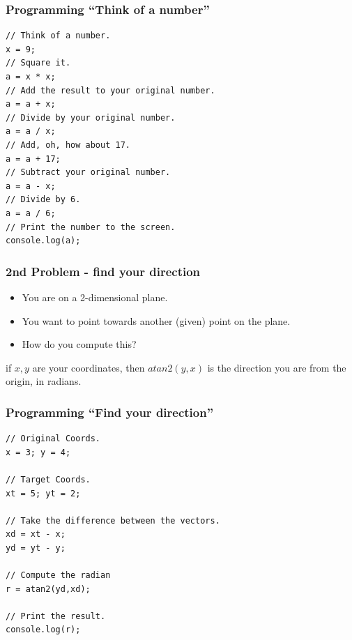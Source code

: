 \documentclass{beamer}
\begin{document}
\begin{frame}[fragile]
\frametitle{Programming ``Think of a number''}

\begin{codeblock}
\begin{verbatim}
// Think of a number.                                                                                                     
x = 9;
// Square it.                                                                                                                  
a = x * x;
// Add the result to your original number.                                                                                     
a = a + x;
// Divide by your original number.                                                                                             
a = a / x;
// Add, oh, how about 17.                                                                                                      
a = a + 17;
// Subtract your original number.                                                                                              
a = a - x;
// Divide by 6.                                                                                                                
a = a / 6;
// Print the number to the screen.
console.log(a);
\end{verbatim}                
\end{codeblock}
\end{frame}

\begin{frame}[fragile]
\frametitle{2nd Problem - find your direction}
\Large

\begin{itemize}
\item You are on a 2-dimensional plane.
\item You want to point towards another (given) point on the plane.
\item How do you compute this?
\end{itemize}

\frameskip

if $x,y$ are your coordinates, then $atan2(y,x)$
is the direction you are from the origin, in radians.

\end{frame}


\begin{frame}[fragile]
\frametitle{Programming ``Find your direction''}

\begin{codeblock}
\begin{verbatim}
// Original Coords.
x = 3; y = 4;

// Target Coords.
xt = 5; yt = 2;

// Take the difference between the vectors.
xd = xt - x;
yd = yt - y;

// Compute the radian                                                                                                         
r = atan2(yd,xd);

// Print the result.
console.log(r);
\end{verbatim}                
\end{codeblock}
\end{frame}
\end{document}
